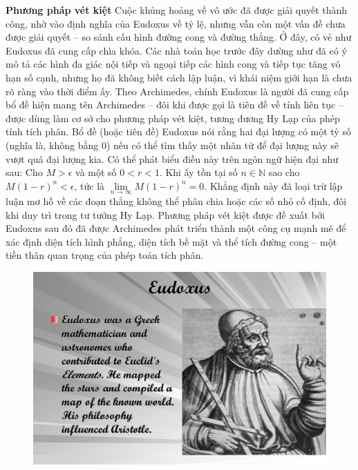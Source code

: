 \begin{multicols}{2}
	\vskip 0.1cm
	\textbf{\color{lichsutoanhoc}Phương pháp vét kiệt}
	\vskip 0.1cm
	Cuộc khủng hoảng về vô ước đã được giải quyết thành công, nhờ vào định nghĩa của Eudoxus về tỷ lệ, nhưng vẫn còn một vấn đề chưa được giải quyết -- so sánh cấu hình đường cong và đường thẳng. 
	\vskip 0.1cm
	Ở đây, có vẻ như Eudoxus đã cung cấp chìa khóa.
	\vskip 0.1cm
	Các nhà toán học trước đây dường như đã có ý mô tả các hình đa giác nội tiếp và ngoại tiếp các hình cong và tiếp tục tăng vô hạn số cạnh, nhưng họ đã không biết cách lập luận, vì khái niệm giới hạn là chưa rõ ràng vào thời điểm ấy. 
	\vskip 0.1cm
	Theo Archimedes, chính Eudoxus là người đã cung cấp bổ đề hiện mang tên Archimedes -- đôi khi được gọi là tiên đề về tính liên tục -- được dùng làm cơ sở cho phương pháp vét kiệt, tương đương  Hy Lạp của phép tính tích phân.
	\vskip 0.1cm
	Bổ đề (hoặc tiên đề) Eudoxus nói rằng hai đại lượng có một tỷ số (nghĩa là, không bằng $0$) nếu có thể tìm thấy một nhân tử để đại lượng này sẽ vượt quá đại lượng kia. Có thể phát biểu điều này trên ngôn ngữ hiện đại như sau: Cho $M > \epsilon$  và một số $0 < r < 1$. Khi ấy tồn tại số $n \in \mathbb{N}$  sao cho $M(1-r)^n < \epsilon$, tức là $\mathop {\lim }\limits_{n \to \infty } M{\left( {1 - r} \right)^n} = 0$. 
	\vskip 0.1cm
	Khẳng định này đã loại trừ lập luận mơ hồ về các đoạn thẳng không thể phân chia hoặc các số nhỏ cố định, đôi khi duy trì trong tư tưởng Hy Lạp. 
	\vskip 0.1cm
	Phương pháp vét kiệt được đề xuất bởi Eudoxus sau đó đã được Archimedes phát triển thành một công cụ mạnh mẽ để xác định diện tích hình phẳng, diện tích bề mặt và thể tích đường cong --  một tiền thân quan trọng của phép toán tích phân.
	\begin{figure}[H]
		\vspace*{-5pt}
		\centering
		\captionsetup{labelformat= empty, justification=centering}
		\includegraphics[width= 1\linewidth]{1}

\end{figure}
\end{multicols}
